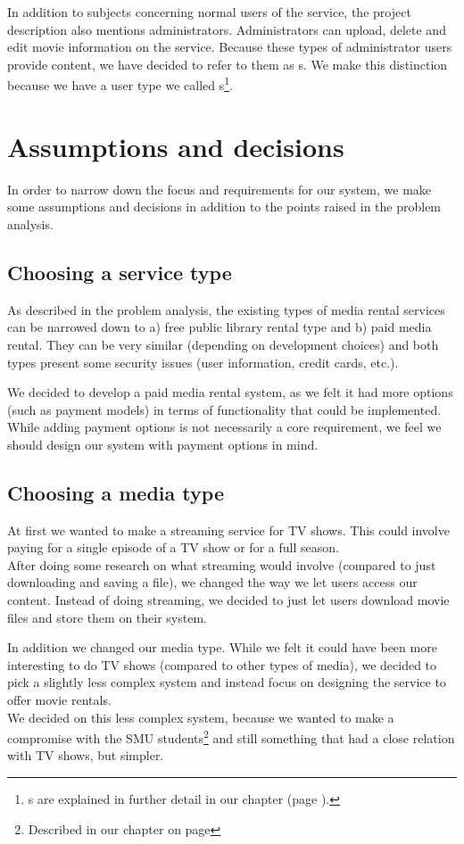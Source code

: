 In addition to subjects concerning normal users of the service, the project description also mentions administrators. Administrators can upload, delete and edit movie information on the service. Because these types of administrator users provide content, we have decided to refer to them as s. We make this distinction because we have a user type we called s\footnote{s are explained in further detail in our  chapter (page \pageref{Design}).}.
\section{Assumptions and decisions}
\label{Overview_assumptions}
In order to narrow down the focus and requirements for our system, we make some assumptions and decisions in addition to the points raised in the problem analysis. 
\subsection{Choosing a service type}
\label{Overview_assumptions_stype}
As described in the problem analysis, the existing types of media rental services can be narrowed down to a) free public library rental type and b) paid media rental. They can be very similar (depending on development choices) and both types present some security issues (user information, credit cards, etc.).

We decided to develop a paid media rental system, as we felt it had more options (such as payment models) in terms of functionality that could be implemented. While adding payment options is not necessarily a core requirement, we feel we should design our system with payment options in mind.
\subsection{Choosing a media type}
\label{Overview_assumptions_mtype}
At first we wanted to make a streaming service for TV shows. This could involve paying for a single episode of a TV show or for a full season. \\After doing some research on what streaming would involve (compared to just downloading and saving a file), we changed the way we let users access our content. Instead of doing streaming, we decided to just let users download movie files and store them on their system.

In addition we changed our media type. While we felt it could have been more interesting to do TV shows (compared to other types of media), we decided to pick a slightly less complex system and instead focus on designing the service to offer movie rentals. \\ We decided on this less complex system, because we wanted to make a compromise with the SMU students\footnote{Described in our  chapter on page \pageref{Collaboration}} and still something that had a close relation with TV shows, but simpler.
